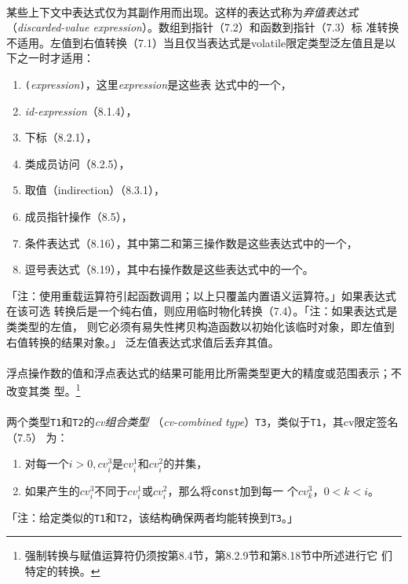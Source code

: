 \paragraph{}
某些上下文中表达式仅为其副作用而出现。这样的表达式称为\textit{弃值表达式}
（\textit{discarded-value expression}）。数组到指针（7.2）和函数到指针（7.3）标
准转换不适用。左值到右值转换（7.1）当且仅当表达式是volatile限定类型泛左值且是以
下之一时才适用：
\begin{enumerate}
  \item{\texttt{(}\textit{expression}\texttt{)}，这里\textit{expression}是这些表
    达式中的一个，}
  \item{\textit{id-expression}（8.1.4），}
  \item{下标（8.2.1），}
  \item{类成员访问（8.2.5），}
  \item{取值（indirection）（8.3.1），}
  \item{成员指针操作（8.5），}
  \item{条件表达式（8.16），其中第二和第三操作数是这些表达式中的一个，}
  \item{逗号表达式（8.19），其中右操作数是这些表达式中的一个。}
\end{enumerate}
「注：使用重载运算符引起函数调用；以上只覆盖内置语义运算符。」如果表达式在该可选
转换后是一个纯右值，则应用临时物化转换（7.4）。「注：如果表达式是类类型的左值，
则它必须有易失性拷贝构造函数以初始化该临时对象，即左值到右值转换的结果对象。」
泛左值表达式求值后丢弃其值。

\paragraph{}
浮点操作数的值和浮点表达式的结果可能用比所需类型更大的精度或范围表示；不改变其类
型。\footnote{强制转换与赋值运算符仍须按第8.4节，第8.2.9节和第8.18节中所述进行它
们特定的转换。}

\paragraph{}
两个类型\texttt{T1}和\texttt{T2}的\textit{cv组合类型}
（\textit{cv-combined type}）\texttt{T3}，类似于\texttt{T1}，其cv限定签名（7.5）
为：
\begin{enumerate}
  \item{对每一个$i > 0, cv_i^3$是$cv_i^1$和$cv_i^2$的并集，}
  \item{如果产生的$cv_i^3$不同于$cv_i^1$或$cv_i^2$，那么将\texttt{const}加到每一
    个$cv_k^3$，$0 < k < i$。}
\end{enumerate}
「注：给定类似的\texttt{T1}和\texttt{T2}，该结构确保两者均能转换到\texttt{T3}。」

